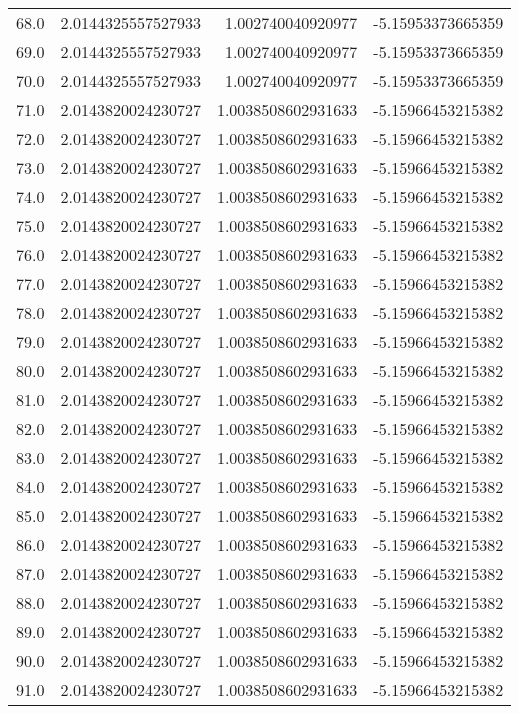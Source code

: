 \begin{longtable}{lrrr}
68.0 & 2.0144325557527933 & 1.002740040920977 & -5.15953373665359 \\
69.0 & 2.0144325557527933 & 1.002740040920977 & -5.15953373665359 \\
70.0 & 2.0144325557527933 & 1.002740040920977 & -5.15953373665359 \\
71.0 & 2.0143820024230727 & 1.0038508602931633 & -5.15966453215382 \\
72.0 & 2.0143820024230727 & 1.0038508602931633 & -5.15966453215382 \\
73.0 & 2.0143820024230727 & 1.0038508602931633 & -5.15966453215382 \\
74.0 & 2.0143820024230727 & 1.0038508602931633 & -5.15966453215382 \\
75.0 & 2.0143820024230727 & 1.0038508602931633 & -5.15966453215382 \\
76.0 & 2.0143820024230727 & 1.0038508602931633 & -5.15966453215382 \\
77.0 & 2.0143820024230727 & 1.0038508602931633 & -5.15966453215382 \\
78.0 & 2.0143820024230727 & 1.0038508602931633 & -5.15966453215382 \\
79.0 & 2.0143820024230727 & 1.0038508602931633 & -5.15966453215382 \\
80.0 & 2.0143820024230727 & 1.0038508602931633 & -5.15966453215382 \\
81.0 & 2.0143820024230727 & 1.0038508602931633 & -5.15966453215382 \\
82.0 & 2.0143820024230727 & 1.0038508602931633 & -5.15966453215382 \\
83.0 & 2.0143820024230727 & 1.0038508602931633 & -5.15966453215382 \\
84.0 & 2.0143820024230727 & 1.0038508602931633 & -5.15966453215382 \\
85.0 & 2.0143820024230727 & 1.0038508602931633 & -5.15966453215382 \\
86.0 & 2.0143820024230727 & 1.0038508602931633 & -5.15966453215382 \\
87.0 & 2.0143820024230727 & 1.0038508602931633 & -5.15966453215382 \\
88.0 & 2.0143820024230727 & 1.0038508602931633 & -5.15966453215382 \\
89.0 & 2.0143820024230727 & 1.0038508602931633 & -5.15966453215382 \\
90.0 & 2.0143820024230727 & 1.0038508602931633 & -5.15966453215382 \\
91.0 & 2.0143820024230727 & 1.0038508602931633 & -5.15966453215382 \\

\end{longtable}
